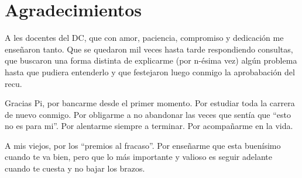 \chapter*{Agradecimientos}

A les docentes del DC, que con amor, paciencia, compromiso y dedicación me enseñaron tanto. Que se quedaron mil veces hasta tarde respondiendo consultas, que buscaron una forma distinta de explicarme (por n-ésima vez) algún problema hasta que pudiera entenderlo y que festejaron luego conmigo la aprobabación del recu. 

Gracias Pi, por bancarme desde el primer momento. Por estudiar toda la carrera de nuevo conmigo. Por obligarme a no abandonar las veces que sentía que ``esto no es para mi''. Por alentarme siempre a terminar. Por acompañarme en la vida.

A mis viejos, por los ``premios al fracaso''. Por enseñarme que esta buenísimo cuando te va bien, pero que lo más importante y valioso es seguir adelante cuando te cuesta y no bajar los brazos.

